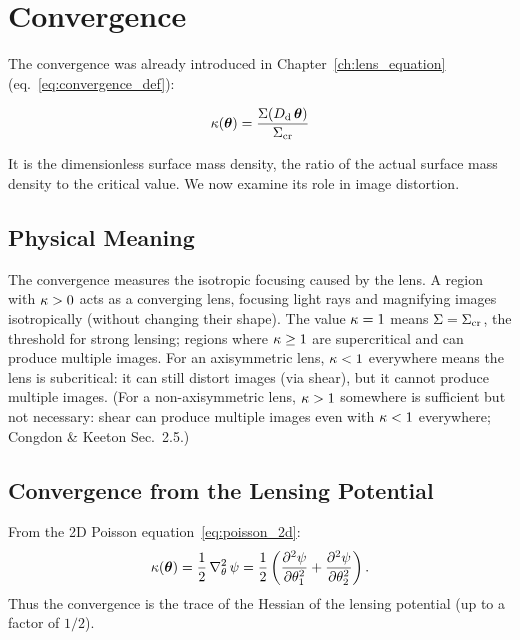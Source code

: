 \section{Convergence}
\label{sec:convergence}

The convergence was already introduced in
Chapter~\ref{ch:lens_equation} (eq.~\ref{eq:convergence_def}):

\begin{equation}
    \kappa(\boldsymbol{\theta}) = \frac{\Sigma(D_{\mathrm{d}}\,\boldsymbol{\theta})}{\Sigma_{\mathrm{cr}}}
    \label{eq:kappa_def_review}
\end{equation}

It is the dimensionless surface mass density, the ratio of
the actual surface mass density to the critical value.  We now examine
its role in image distortion.

\subsection{Physical Meaning}

The convergence measures the isotropic focusing caused by
the lens.  A region with $\kappa > 0$ acts as a converging lens,
focusing light rays and magnifying images isotropically (without
changing their shape).  The value $\kappa = 1$ means $\Sigma = \Sigma_{\mathrm{cr}}$,
the threshold for strong lensing; regions where $\kappa \geq 1$ are
supercritical and can produce multiple images.  For an axisymmetric
lens, $\kappa < 1$ everywhere means the lens is subcritical: it can
still distort images (via shear), but it cannot produce multiple images.
(For a non-axisymmetric lens, $\kappa > 1$ somewhere is sufficient but
not necessary: shear can produce multiple images even with $\kappa < 1$
everywhere; Congdon \& Keeton Sec.~2.5.)

\subsection{Convergence from the Lensing Potential}

From the 2D Poisson equation~\eqref{eq:poisson_2d}:
\begin{equation}
    \kappa(\boldsymbol{\theta}) = \frac{1}{2}\,\nabla^2_\theta\, \psi
    = \frac{1}{2}\left(
    \frac{\partial^2 \psi}{\partial\theta_1^2}
    + \frac{\partial^2 \psi}{\partial\theta_2^2}\right) .
    \label{eq:kappa_from_psi}
\end{equation}
Thus the convergence is the trace of the Hessian of the
lensing potential (up to a factor of $1/2$).


